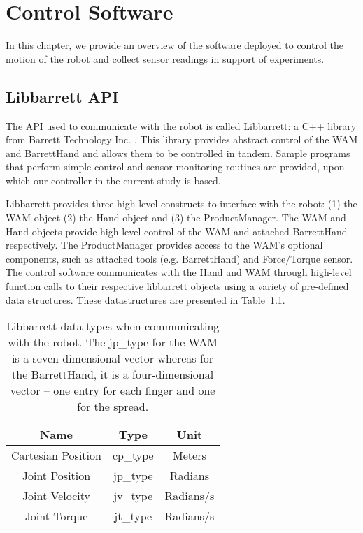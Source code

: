 \chapter{Control Software}
\label{chap4}

In this chapter, we provide an overview of the software deployed to control the motion of the robot and collect sensor readings in support of experiments.


\section{Libbarrett API} 

The API used to communicate with the robot is called Libbarrett: a C++ library from Barrett Technology Inc. \cite{libbarrett}.
This library provides abstract control of the WAM and BarrettHand and allows them to be controlled in tandem.
Sample programs that perform simple control and sensor monitoring routines are provided, upon which our controller in the current study is based.

Libbarrett provides three high-level constructs to interface with the robot: (1) the WAM object (2) the Hand object and (3) the ProductManager.
The WAM and Hand objects provide high-level control of the WAM and attached BarrettHand respectively.
The ProductManager provides access to the WAM’s optional components, such as attached tools (e.g.  BarrettHand) and Force/Torque sensor.
The control software communicates with the Hand and WAM through high-level function calls to their respective libbarrett objects using a variety of pre-defined data structures. 
These datastructures are presented in Table~\ref{tbl:data_types}.

\begin{table}[h]
\begin{tabular}{| c | c | c |}
    \hline
    Name & Type & Unit \\
    \hline 
    Cartesian Position & cp\_type & Meters\\
    Joint Position & jp\_type & Radians\\
    Joint Velocity & jv\_type & Radians/s\\
    Joint Torque & jt\_type & Radians/s \\
    \hline 
\end{tabular}
\caption{Libbarrett data-types when communicating with the robot. The jp\_type for the WAM is a seven-dimensional vector whereas for the BarrettHand, it is a four-dimensional vector -- one entry for each finger and one for the spread.}
\label{tbl:data_types}
\end{table}


